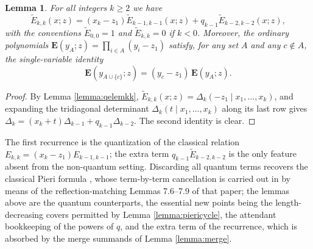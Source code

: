 \documentclass{amsart}
\newtheorem{lemma}{Lemma}[section]
\theoremstyle{definition}
\theoremstyle{remark}
\numberwithin{equation}{section}
\newcommand{\wte}{\mathbf{E}}
\newcommand{\qelem}{\widetilde{E}}
\begin{document}
\begin{lemma} \label{lemma:elemrecursion}
For all integers $k\geq2$ we have
$$\qelem_{k,k}(x;z)=(x_k-z_1)\qelem_{k-1,k-1}(x;z)+q_{k-1}\qelem_{k-2,k-2}(x;z),$$
with the conventions $\qelem_{0,0}=1$ and $\qelem_{k,k}=0$ if $k<0$. Moreover, the ordinary polynomials $\wte(y_A;z)=\prod_{i\in A}(y_i-z_1)$ satisfy, for any set $A$ and any $c\notin A$, the single-variable identity
$$\wte(y_{A\cup\{c\}};z)=(y_c-z_1)\,\wte(y_A;z).$$
\end{lemma}
\begin{proof}
By Lemma \ref{lemma:qelemkk}, $\qelem_{k,k}(x;z)=\Delta_k(-z_1\mid x_1,\ldots,x_k)$, and expanding the tridiagonal determinant $\Delta_k(t\mid x_1,\ldots,x_k)$ along its last row gives $\Delta_k=(x_k+t)\Delta_{k-1}+q_{k-1}\Delta_{k-2}$. The second identity is clear.
\end{proof}

The first recurrence is the quantization of the classical relation $E_{k,k}=(x_k-z_1)E_{k-1,k-1}$; the extra term $q_{k-1}\qelem_{k-2,k-2}$ is the only feature absent from the non-quantum setting. Discarding all quantum terms recovers the classical Pieri formula \cite[Theorem~7.1]{samuelmolev}, whose term-by-term cancellation is carried out in \cite[Proof of Proposition~4.4]{samuelmolev} by means of the reflection-matching Lemmas 7.6--7.9 of that paper; the lemmas above are the quantum counterparts, the essential new points being the length-decreasing covers permitted by Lemma \ref{lemma:piericycle}, the attendant bookkeeping of the powers of $q$, and the extra term of the recurrence, which is absorbed by the merge summands of Lemma \ref{lemma:merge}.
\end{document}
